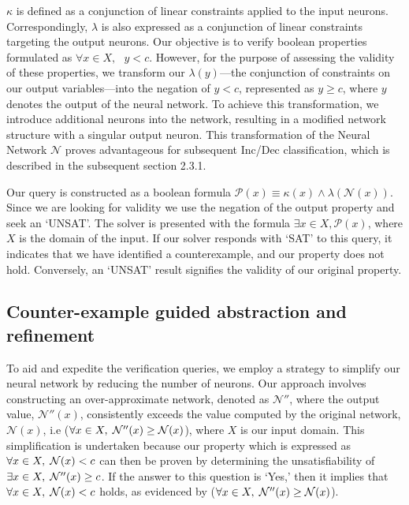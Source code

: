 $\kappa$ is defined as a conjunction of linear constraints applied to the 
input neurons. Correspondingly, $\lambda$ is also expressed as a conjunction 
of linear constraints targeting the output neurons. Our objective is to verify
boolean properties formulated as $\forall x \in X,\textit{ } y < c$. However, 
for the purpose of assessing the validity of these properties, we transform 
our $\lambda(y)$—the conjunction of constraints on our output variables—into
the negation of $y < c$, represented as $y \geq c$, where $y$ denotes the output 
of the neural network. To achieve this transformation, we introduce additional
neurons into the network, resulting in a modified network structure with a singular
output neuron. This transformation of the Neural Network $\mathcal{N}$ proves 
advantageous for subsequent Inc/Dec classification, which is described in the
subsequent section 2.3.1.

Our query is constructed as a boolean formula 
\(\mathcal{P}(x) \equiv \kappa(x) \land \lambda(\mathcal{N}(x))\). 
Since we are looking for validity we use the negation of the output 
property and seek an `UNSAT'. The solver is presented with the formula 
\(\exists x \in X, \mathcal{P}(x)\), where \(X\) is the domain of the input. 
If our solver responds with `SAT' to this query, it indicates that we have 
identified a counterexample, and our property does not hold. Conversely, an
 `UNSAT' result signifies the validity of our original property.


\subsection{Counter-example guided abstraction and refinement}
To aid and expedite the verification queries, we employ a strategy to simplify 
our neural network by reducing the number of neurons. Our approach involves
 constructing an over-approximate network, denoted as $\mathcal{N''}$, where 
 the output value, $\mathcal{N''}(x)$, consistently exceeds the value computed 
 by the original network, $\mathcal{N}(x)$, i.e ($\forall x \in X, \hspace{1mm} 
 \mathcal{N''}(x) \geq \mathcal{N}(x)$), where $X$ is our input domain. This
  simplification is undertaken because our property which is expressed as
   $\forall x \in X, \hspace{1mm} \mathcal{N}(x) < c$ can then be proven by 
   determining the unsatisfiability of $\exists x \in X, \hspace{1mm}\mathcal{N''}(x)
 \geq c$. If the answer to this question is `Yes,' then it implies that
  $\forall x \in X, \hspace{1mm} \mathcal{N}(x) < c$ holds, as evidenced by 
  ($\forall x \in X, \hspace{1mm} \mathcal{N''}(x) \geq \mathcal{N}(x)$).



